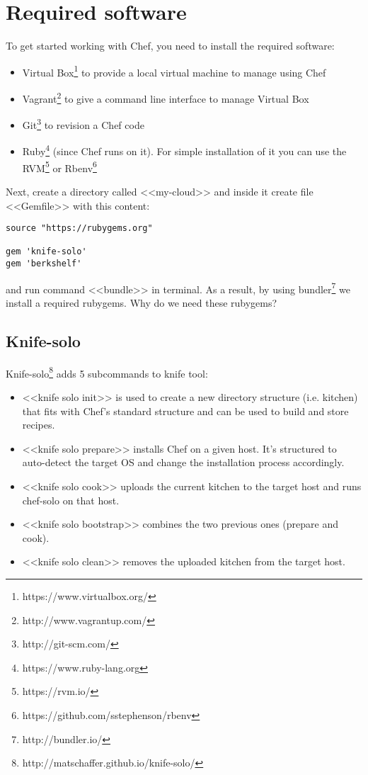 \section{Required software}

To get started working with Chef, you need to install the required software:

\begin{itemize}
  \item Virtual Box\footnote{https://www.virtualbox.org/} to provide a local virtual machine to manage using Chef
  \item Vagrant\footnote{http://www.vagrantup.com/} to give a command line interface to manage Virtual Box
  \item Git\footnote{http://git-scm.com/} to revision a Chef code
  \item Ruby\footnote{https://www.ruby-lang.org} (since Chef runs on it). For simple installation of it you can use the RVM\footnote{https://rvm.io/} or Rbenv\footnote{https://github.com/sstephenson/rbenv}
\end{itemize}

Next, create a directory called <<my-cloud>> and inside it create file <<Gemfile>> with this content:

\begin{lstlisting}[label=lst:my-cloud-required1,title=my-cloud/Gemfile]
source "https://rubygems.org"

gem 'knife-solo'
gem 'berkshelf'
\end{lstlisting}

and run command <<bundle>> in terminal. As a result, by using bundler\footnote{http://bundler.io/} we install a required rubygems. Why do we need these rubygems?

\subsection{Knife-solo}

Knife-solo\footnote{http://matschaffer.github.io/knife-solo/} adds 5 subcommands to knife tool:

\begin{itemize}
  \item <<knife solo init>> is used to create a new directory structure (i.e. kitchen) that fits with Chef's standard structure and can be used to build and store recipes.
  \item <<knife solo prepare>> installs Chef on a given host. It's structured to auto-detect the target OS and change the installation process accordingly.
  \item <<knife solo cook>> uploads the current kitchen to the target host and runs chef-solo on that host.
  \item <<knife solo bootstrap>> combines the two previous ones (prepare and cook).
  \item <<knife solo clean>> removes the uploaded kitchen from the target host.
\end{itemize}

